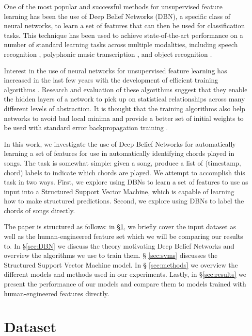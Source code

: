 \documentclass{article}
\begin{document}
One of the most popular and successful methods for unsupervised feature
learning has been the use of Deep Belief Networks (DBN), a specific class of
neural networks, to learn a set of features that can then be used for
classification tasks. This technique has been used to achieve state-of-the-art
performance on a number of standard learning tasks across multiple modalities,
including speech recognition \cite{Mohamed_acousticmodeling, dahl2010phone},
polyphonic music transcription \cite{boulanger2012modeling}, and object
recognition \cite{krizhevsky2012imagenet, ciresan2012multi, rifai2011manifold}.

Interest in the use of neural networks for unsupervised feature learning has
increased in the last few years with the development of efficient training
algorithms \cite{Hinton06afast}. Research and evaluation of these algorithms
suggest that they enable the hidden layers of a network to pick up on
statistical relationships across many different levels of abstraction. It is
thought that the training algorithms also help networks to avoid bad local
minima and provide a better set of initial weights to be used with standard
error backpropagation training \cite{Bengio_learning}.

In this work, we investigate the use of Deep Belief Networks for automatically
learning a set of features for use in automatically identifying chords played
in songs. The task is somewhat simple: given a song, produce a list of
(timestamp, chord) labels to indicate which chords are played. We attempt to
accomplish this task in two ways. First, we explore using DBNs to learn a set
of features to use as input into a Structured Support Vector Machine, which is
capable of learning how to make structured predictions.  Second, we explore
using DBNs to label the chords of songs directly.

The paper is structured as follows: in \S \ref{sec:dataset}, we briefly cover
the input dataset as well as the human-engineered feature set which we will be
comparing our results to. In \S \ref{sec:DBN} we discuss the theory motivating
Deep Belief Networks and overview the algorithms we use to train them. \S
\ref{sec:svms} discusses the Structured Support Vector Machine model. In \S
\ref{sec:methods} we overview the different models and methods used in our
experiments. Lastly, in \S \ref{sec:results} we present the performance of our
models and compare them to models trained with human-engineered features
directly.


\section{Dataset} 
\label{sec:dataset}
\end{document}
